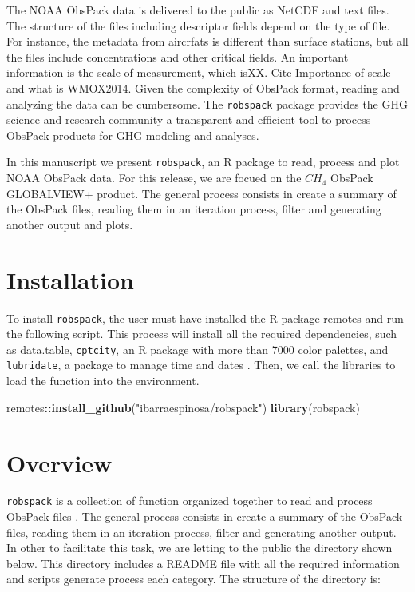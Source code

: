 \documentclass[preprint, 3p,
authoryear]{elsarticle} %
\newenvironment{Shaded}{\begin{snugshade}}{\end{snugshade}}
\newcommand{\FunctionTok}[1]{\textcolor[rgb]{0.13,0.29,0.53}{\textbf{#1}}}
\newcommand{\NormalTok}[1]{#1}
\newcommand{\SpecialCharTok}[1]{\textcolor[rgb]{0.81,0.36,0.00}{\textbf{#1}}}
\newcommand{\StringTok}[1]{\textcolor[rgb]{0.31,0.60,0.02}{#1}}
\begin{document}
The NOAA ObsPack data is delivered to the public as NetCDF and text
files. The structure of the files including descriptor fields depend on
the type of file. For instance, the metadata from aircrfats is different
than surface stations, but all the files include concentrations and
other critical fields. An important information is the scale of
measurement, which isXX. Cite Importance of scale and what is WMOX2014.
Given the complexity of ObsPack format, reading and analyzing the data
can be cumbersome. The \texttt{robspack} package provides the GHG
science and research community a transparent and efficient tool to
process ObsPack products for GHG modeling and analyses.

In this manuscript we present \texttt{robspack}, an R package to read,
process and plot NOAA ObsPack data. For this release, we are focued on
the \(CH_4\) ObsPack GLOBALVIEW+ product. The general process consists
in create a summary of the ObsPack files, reading them in an iteration
process, filter and generating another output and plots.

\hypertarget{installation}{%
\section{Installation}\label{installation}}

To install \texttt{robspack}, the user must have installed the R package
remotes and run the following script. This process will install all the
required dependencies, such as data.table, \texttt{cptcity}, an R
package with more than 7000 color palettes, and \texttt{lubridate}, a
package to manage time and dates \citep{lu, cpt}. Then, we call the
libraries to load the function into the environment.

\begin{Shaded}
\begin{Highlighting}[]
\NormalTok{remotes}\SpecialCharTok{::}\FunctionTok{install\_github}\NormalTok{(}\StringTok{"ibarraespinosa/robspack"}\NormalTok{)}
\FunctionTok{library}\NormalTok{(robspack)}
\end{Highlighting}
\end{Shaded}

\hypertarget{overview}{%
\section{Overview}\label{overview}}

\texttt{robspack} is a collection of function organized together to read
and process ObsPack files \citep{masarie2014obspack}. The general
process consists in create a summary of the ObsPack files, reading them
in an iteration process, filter and generating another output. In other
to facilitate this task, we are letting to the public the directory
shown below. This directory includes a README file with all the required
information and scripts generate process each category. The structure of
the directory is:
\end{document}
